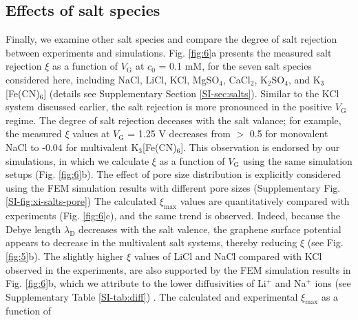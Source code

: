 \documentclass[journal=nalefd,email=true, hyperref=true, keywords=false]{achemso}
\newcommand{\Fig}{Fig.}
\begin{document}
\subsection{Effects of salt species}
\label{sec:salts}

Finally, we examine other salt species and compare the degree of salt
rejection between experiments and simulations. \Fig{} \ref{fig:6}a
presents the measured salt rejection $\xi$ as a function of
$V_{\mathrm{G}}$ at $c_{0}$ = 0.1 mM, for the seven salt species
considered here, including NaCl, LiCl, KCl, MgSO$_{4}$, CaCl$_{2}$,
K$_{2}$SO$_{4}$, and K$_{3}$[Fe(CN)$_{6}$] (details see Supplementary
Section \ref{SI-sec:salts}). Similar to the KCl system discussed
earlier, the salt rejection is more pronounced in the positive
$V_{\mathrm{G}}$ regime. 
The degree of salt rejection deceases with
the salt valance; for example, the measured $\xi$ values at
$V_{\mathrm{G}}$ = 1.25 V decreases from $>$ 0.5 for monovalent NaCl
to -0.04 for multivalent K$_{3}$[Fe(CN)$_{6}$]. This observation is
endorsed by our simulations, in which we calculate $\xi$ as a function
of $V_{\mathrm{G}}$ using the same simulation setups (\Fig{}
\ref{fig:6}b). 
{
The effect of pore size distribution is explicitly
considered using the FEM simulation results with different pore sizes
(Supplementary \Fig{} \ref{SI-fig:xi-salts-pore})} 
The calculated $\xi_{\mathrm{max}}$ values are
quantitatively compared with experiments (\Fig{} \ref{fig:6}c), and
the same trend is observed. Indeed, because the Debye length
$\lambda_{\mathrm{D}}$ decreases with the salt valence, the graphene
surface potential appears to decrease in the multivalent salt systems,
thereby reducing $\xi$ (see \Fig{} \ref{fig:5}b).
{
The slightly higher $\xi$ values of LiCl and NaCl compared with KCl observed in the experiments, 
are also supported by the FEM simulation results in \Fig{} \ref{fig:6}b, 
which we attribute to the lower diffusivities of Li$^{+}$ and Na$^{+}$ ions (see Supplementary Table \ref{SI-tab:diff})
}.
The calculated and
experimental $\xi_{\mathrm{max}}$ as a function of
\end{document}
